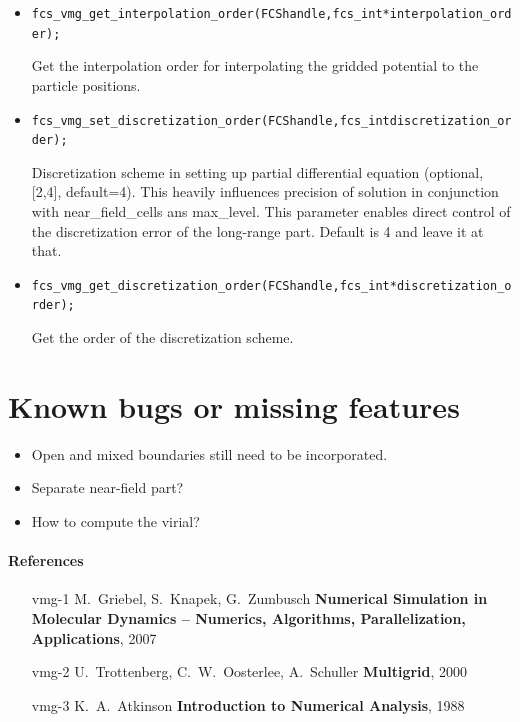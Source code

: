 \begin{itemize}
  \item
\begin{alltt}
fcs\_vmg\_get\_interpolation\_order(FCS handle, fcs\_int *interpolation\_order);
\end{alltt}
Get the interpolation order for interpolating the gridded potential to the particle positions.

  \item
\begin{alltt}
fcs\_vmg\_set\_discretization\_order(FCS handle, fcs\_int discretization\_order);
\end{alltt}
Discretization scheme in setting up partial differential equation (optional, [2,4], default=4).
This heavily influences precision of solution in conjunction with near\_field\_cells ans max\_level. This parameter enables direct control of the discretization error of the long-range part. Default is 4 and leave it at that.

  \item
\begin{alltt}
fcs\_vmg\_get\_discretization\_order(FCS handle, fcs\_int *discretization\_order);
\end{alltt}
Get the order of the discretization scheme.

\end{itemize}

\section*{Known bugs or missing features}

\begin{itemize}
  \item Open and mixed boundaries still need to be incorporated.
  \item Separate near-field part?
  \item How to compute the virial?
\end{itemize}

\paragraph{References}
\begin{footnotesize}
\begin{itemize}
  \item[vmg-1] M.~Griebel, S.~Knapek, G.~Zumbusch \textbf{Numerical Simulation in Molecular Dynamics -- Numerics, Algorithms, Parallelization, Applications}, 2007
  \item[vmg-2] U.~Trottenberg, C.~W.~Oosterlee, A.~Schuller \textbf{Multigrid}, 2000
  \item[vmg-3] K.~A.~Atkinson \textbf{Introduction to Numerical Analysis}, 1988
\end{itemize}
\end{footnotesize}





